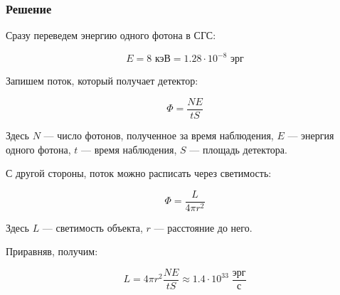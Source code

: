 \documentclass[a4paper, 12pt]{article}
\begin{document}
\subsubsection*{Решение}

Сразу переведем энергию одного фотона в СГС:

\begin{equation}
	E = 8\text{ кэВ} = 1.28 \cdot 10^{-8} \text{ эрг}
\end{equation}

Запишем поток, который получает детектор:

\begin{equation}
	\Phi = \frac{N E}{t S}
\end{equation}

Здесь $N$ --- число фотонов, полученное за время наблюдения, $E$ --- энергия одного фотона, $t$ --- время наблюдения, $S$ --- площадь детектора.

С другой стороны, поток можно расписать через светимость:

\begin{equation}
	\Phi = \frac{L}{4 \pi r^2}
\end{equation}

Здесь $L$ --- светимость объекта, $r$ --- расстояние до него.

Приравняв, получим:

\begin{equation}
	L = 4 \pi r^2 \frac{N E}{t S} \approx \boxed{1.4 \cdot 10^{33} \; \frac{\text{эрг}}{\text{с}}}
\end{equation}
\end{document}
